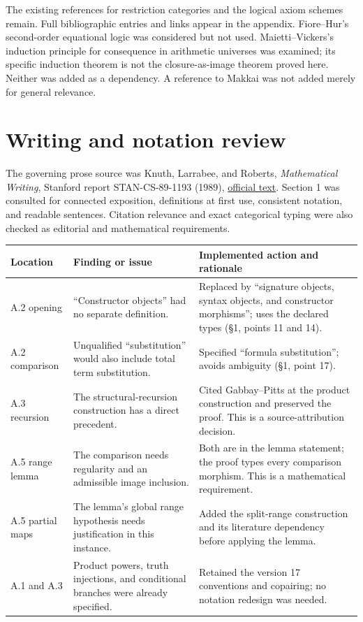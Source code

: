\documentclass[10pt]{article}
\begin{document}
The existing references for restriction categories and the logical axiom
schemes remain. Full bibliographic entries and links appear in the appendix.
Fiore--Hur's second-order equational logic was considered but not used.
Maietti--Vickers's induction principle for consequence in arithmetic universes
was examined; its specific induction theorem is not the closure-as-image
theorem proved here. Neither was added as a dependency. A reference to Makkai
was not added merely for general relevance.

\newpage
\section*{Writing and notation review}
The governing prose source was Knuth, Larrabee, and Roberts,
\emph{Mathematical Writing}, Stanford report STAN-CS-89-1193 (1989),
\href{https://www-cs-faculty.stanford.edu/~knuth/papers/cs1193.pdf}{official text}.
Section 1 was consulted for connected exposition, definitions at first use,
consistent notation, and readable sentences. Citation relevance and exact
categorical typing were also checked as editorial and mathematical requirements.

\begin{tabularx}{\textwidth}{@{}P{0.17\textwidth}P{0.29\textwidth}Y@{}}
\toprule
Location & Finding or issue & Implemented action and rationale\\\midrule
A.2 opening & ``Constructor objects'' had no separate definition. &
Replaced by ``signature objects, syntax objects, and constructor morphisms'';
uses the declared types (\S1, points 11 and 14).\\
A.2 comparison & Unqualified ``substitution'' would also include total term
substitution. & Specified ``formula substitution''; avoids ambiguity
(\S1, point 17).\\
A.3 recursion & The structural-recursion construction has a direct precedent. &
Cited Gabbay--Pitts at the product construction and preserved the proof.
This is a source-attribution decision.\\
A.5 range lemma & The comparison needs regularity and an admissible image
inclusion. & Both are in the lemma statement; the proof types every comparison
morphism. This is a mathematical requirement.\\
A.5 partial maps & The lemma's global range hypothesis needs justification in
this instance. & Added the split-range construction and its literature
dependency before applying the lemma.\\
A.1 and A.3 & Product powers, truth injections, and conditional branches were
already specified. & Retained the version 17 conventions and copairing;
no notation redesign was needed.\\\bottomrule
\end{tabularx}
\end{document}
